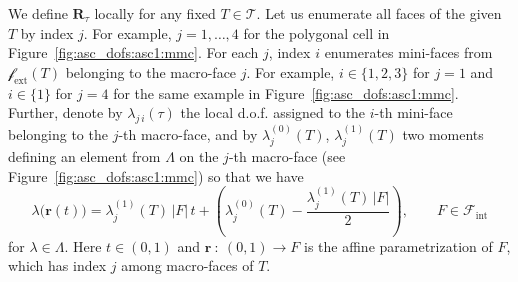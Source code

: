 \documentclass[12pt]{article}
\newcommand{\vect}[1]{\boldsymbol{\mathbf{#1}}}
\newcommand{\bcell}{T}
\newcommand{\bmesh}{{\vect{\mathcal T}}}
\newcommand{\mmesh}{{\vect{\mathcal \tau}}}
\newcommand{\bfaces}[1][]{{\vect{\mathcal F}_{\text{#1}}}}
\newcommand{\mfaces}[1][]{{\vect{\mathcal f}_{\text{#1}}}}
\begin{document}
	We define $\vect R_\mmesh$ locally for any fixed $\bcell\in\bmesh$. Let us enumerate all faces of the given $T$ by index $j$. For example, $j=1,\dots,4$ for the polygonal cell in Figure~\ref{fig:asc_dofs:asc1:mmc}. For each $j$, index $i$ enumerates mini-faces from $\mfaces[ext](T)$ belonging to the macro-face $j$. For example, $i\in\{1,2,3\}$ for $j=1$ and $i\in\{1\}$ for $j=4$ for the same example in Figure~\ref{fig:asc_dofs:asc1:mmc}. Further, denote by $\lambda_{j\,i}(\mmesh)$ the local d.o.f. assigned to the $i$-th mini-face belonging to the $j$-th macro-face, and by $\lambda^{(0)}_{j}(T)$, $\lambda^{(1)}_{j}(T)$ two moments defining an element from $\Lambda$ on the $j$-th macro-face (see Figure~\ref{fig:asc_dofs:asc1:mmc}) so that we have
	\begin{equation}\label{lambda_intermsof_moments}
		{\lambda}\big({\vect r}(t)\big) = \lambda^{(1)}_{j}(T)\,|F|\,t + \left( \lambda^{(0)}_{j}(T) - \frac{\lambda^{(1)}_{j}(T)\,|F|}{2} \right),\qquad  F\in\bfaces[int]
	\end{equation}
	for $\lambda\in\Lambda$. Here $t\in(0,1)$ and ${\vect r}\::\:\left(0,1\right) \rightarrow F$ is the affine parametrization of $F$, which has index $j$ among macro-faces of $T$.
	
\end{document}
